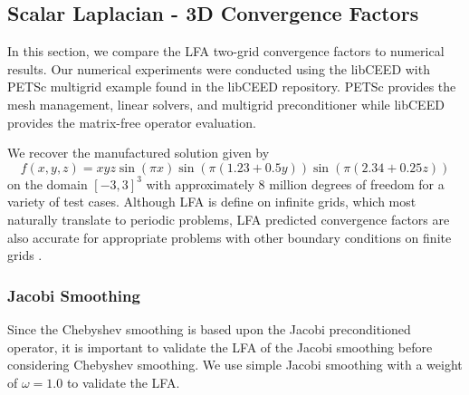 \documentclass[review]{siamart190516}
\begin{document}
\subsection{Scalar Laplacian - 3D Convergence Factors}\label{sec:3dresults}

In this section, we compare the LFA two-grid convergence factors to numerical results.
Our numerical experiments were conducted using the libCEED \cite{libceed-user-manual} with PETSc \cite{petsc-user-ref} multigrid example found in the libCEED repository.
PETSc provides the mesh management, linear solvers, and multigrid preconditioner while libCEED provides the matrix-free operator evaluation.

We recover the manufactured solution given by
\begin{equation}
f \left( x, y, z \right) = x y z \sin \left( \pi x \right) \sin \left( \pi \left( 1.23 + 0.5 y \right) \right) \sin \left( \pi \left( 2.34 + 0.25 z \right) \right)
\end{equation}
on the domain $\left[ -3, 3 \right]^3$ with approximately 8 million degrees of freedom for a variety of test cases.
Although LFA is define on infinite grids, which most naturally translate to periodic problems, LFA predicted convergence factors are also accurate for appropriate problems with other boundary conditions on finite grids \cite{rodrigo2019validity}.

\subsubsection{Jacobi Smoothing}

Since the Chebyshev smoothing is based upon the Jacobi preconditioned operator, it is important to validate the LFA of the Jacobi smoothing before considering Chebyshev smoothing.
We use simple Jacobi smoothing with a weight of $\omega = 1.0$ to validate the LFA.
\end{document}
